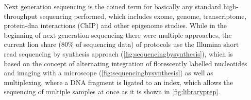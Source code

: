Next generation sequencing is the coined term for basically any standard high-throughput sequencing performed, which includes exome, genome, transcriptome, protein-dna interactions (ChIP) and other epigenome studies. While in the beginning of next generation sequencing there were multiple approaches, the current lion share (80\% of sequencing data) of protocols use the Illumina short read sequencing by synthesis approach (\autoref{fig:sequencingbysynthesis})\cite{Mardis2008,Straiton2019}, which is based on the concept of alternating integration of florescently labelled nucleotides and imaging with a microscope (\autoref{fig:sequencingbysynthesis}) as well as multiplexing, where a DNA fragment is ligated to an index, which allows the sequencing of multiple samples at once \cite{Church1984,Church1988} as it is shown in \autoref{fig:libraryprep}.

